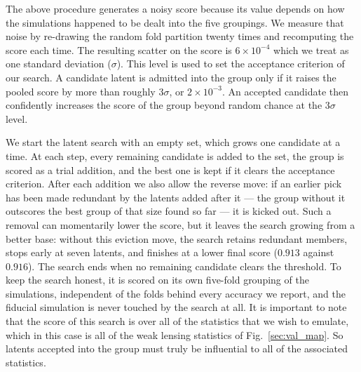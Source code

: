 \documentclass[linenumbers,trackchanges, twocolumn]{aastex701}
\begin{document}
The above procedure generates a noisy score because its value depends on how the simulations happened to be dealt into the five groupings. We measure that noise by re-drawing the random fold partition twenty times and recomputing the score each time. The resulting scatter on the score is $6\times10^{-4}$ which we treat as one standard deviation ($\sigma$). This level is used to set the acceptance criterion of our search. A candidate latent is admitted into the group only if it raises the pooled score by more than roughly $3\sigma$, or $2\times10^{-3}$. An accepted candidate then confidently increases the score of the group beyond random chance at the $3\sigma$ level.

We start the latent search with an empty set, which grows one candidate at a time. At each step, every remaining candidate is added to the set, the group is scored as a trial addition, and the best one is kept if it clears the acceptance criterion. After each addition we also allow the reverse move: if an earlier pick has been made redundant by the latents added after it --- the group without it outscores the best group of that size found so far --- it is kicked out. Such a removal can momentarily lower the score, but it leaves the search growing from a better base: without this eviction move, the search retains redundant members, stops early at seven latents, and finishes at a lower final score ($0.913$ against $0.916$). The search ends when no remaining candidate clears the threshold. To keep the search honest, it is scored on its own five-fold grouping of the simulations, independent of the folds behind every accuracy we report, and the fiducial simulation is never touched by the search at all. It is important to note that the score of this search is over all of the statistics that we wish to emulate, which in this case is all of the weak lensing statistics of Fig.~\ref{sec:val_map}. So latents accepted into the group must truly be influential to all of the associated statistics.
\end{document}
